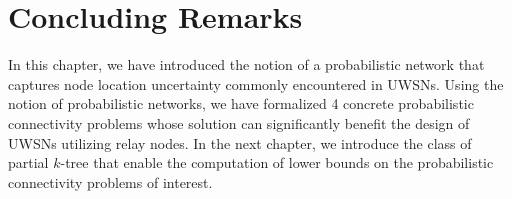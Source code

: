 \section{Concluding Remarks}
\label{sec:cg1sum}
In this chapter, we have introduced the notion of a probabilistic network that captures node location uncertainty commonly encountered in UWSNs. Using the notion of probabilistic networks, we have formalized 4 concrete probabilistic connectivity problems whose solution can significantly benefit the design of UWSNs utilizing relay nodes. In the next chapter, we introduce the class of partial $k$-tree that enable the computation of lower bounds on the probabilistic connectivity problems of interest.
